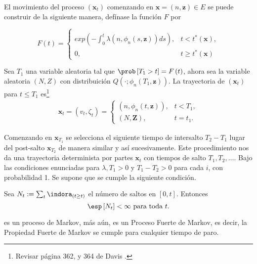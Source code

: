 El movimiento del proceso $\left(\mathbf{x}_{t}\right)$ comenzando
en $\mathbf{x}=\left(n,\mathbf{z}\right)\in E$ se puede construir
de la siguiente manera, def\'inase la funci\'on $F$ por

\begin{equation}
F\left(t\right)=\left\{\begin{array}{ll}\\
exp\left(-\int_{0}^{t}\lambda\left(n,\phi_{n}\left(s,\mathbf{z}\right)\right)ds\right), & t<t^{*}\left(\mathbf{x}\right),\\
0, & t\geq t^{*}\left(\mathbf{x}\right)
\end{array}\right.
\end{equation}

Sea $T_{1}$ una variable aleatoria tal que
$\prob\left[T_{1}>t\right]=F\left(t\right)$, ahora sea la variable
aleatoria $\left(N,Z\right)$ con distribuici\'on
$Q\left(\cdot;\phi_{n}\left(T_{1},\mathbf{z}\right)\right)$. La
trayectoria de $\left(\mathbf{x}_{t}\right)$ para $t\leq T_{1}$
es\footnote{Revisar p\'agina 362, y 364 de Davis \cite{Davis}.}
\begin{eqnarray*}
\mathbf{x}_{t}=\left(v_{t},\zeta_{t}\right)=\left\{\begin{array}{ll}
\left(n,\phi_{n}\left(t,\mathbf{z}\right)\right), & t<T_{1},\\
\left(N,\mathbf{Z}\right), & t=t_{1}.
\end{array}\right.
\end{eqnarray*}

Comenzando en $\mathbf{x}_{T_{1}}$ se selecciona el siguiente
tiempo de intersalto $T_{2}-T_{1}$ lugar del post-salto
$\mathbf{x}_{T_{2}}$ de manera similar y as\'i sucesivamente. Este
procedimiento nos da una trayectoria determinista por partes
$\mathbf{x}_{t}$ con tiempos de salto $T_{1},T_{2},\ldots$. Bajo
las condiciones enunciadas para $\lambda,T_{1}>0$  y
$T_{1}-T_{2}>0$ para cada $i$, con probabilidad 1. Se supone que
se cumple la siguiente condici\'on.

\begin{Sup}\label{Sup3.1.Davis}
Sea $N_{t}:=\sum_{t}\indora_{\left(t\geq t\right)}$ el n\'umero de
saltos en $\left[0,t\right]$. Entonces
\begin{equation}
\esp\left[N_{t}\right]<\infty\textrm{ para toda }t.
\end{equation}
\end{Sup}

es un proceso de Markov, m\'as a\'un, es un Proceso Fuerte de
Markov, es decir, la Propiedad Fuerte de Markov se cumple para
cualquier tiempo de paro.


